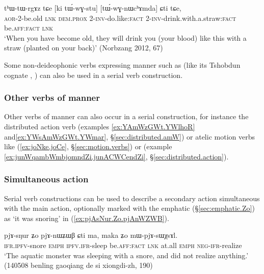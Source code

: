 \begin{exe}
\ex   \label{ex:ki.tWwGstu.tWGnWchAmda}
\gll tʰɯ-tɯ-rgɤz tɕe [ki tɯ́-wɣ-stu] [tɯ́-wɣ-nɯcʰɤmda] ɕti tɕe, \\
\textsc{aor}-2-be.old \textsc{lnk} \textsc{dem}.\textsc{prox} 2-\textsc{inv}-do.like:\textsc{fact} 2-\textsc{inv}-drink.with.a.straw:\textsc{fact} be.\textsc{aff}:\textsc{fact} \textsc{lnk} \\
\glt `When you have become old, they will drink you (your blood) like this with a straw (planted on your back)' (Norbzang 2012, 67)
\end{exe}

Some non-deideophonic verbs expressing manner such as  (like its Tshobdun cognate , \citealt[490--491]{sun12complementation}) can also be used in a serial verb construction.

\subsubsection{Other verbs of manner} \label{sec:svc.manner.other}
Other verbs of manner can also occur in a serial construction, for instance the distributed action verb  (examples \ref{ex:YAmWzGWt.YWlhoR} and\ref{ex:YWsAmWzGWt.YWmar}, §\ref{sec:distributed.amW}) or atelic motion verbs like  (\ref{ex:joNke.joCe}, §\ref{sec:motion.verbs}) or   (example \ref{ex:junWqambWmbjomndZi.junACWCendZi}, §\ref{sec:distributed.action}).

\subsubsection{Simultaneous action} \label{sec:svc.simultaneous}
Serial verb constructions can be used to describe a secondary action simultaneous with the main action, optionally marked with the emphatic  (§\ref{sec:emphatic.Zo}) as  `it was snoring' in (\ref{ex:pjAsNur.Zo.pjAnWZWB}).

\begin{exe}
\ex \label{ex:pjAsNur.Zo.pjAnWZWB}
\gll pjɤ-sŋur ʑo pjɤ-nɯʑɯβ ɕti ma, maka ʑo mɯ-pjɤ-sɯχsɤl. \\
\textsc{ifr}.\textsc{ipfv}-snore \textsc{emph} \textsc{ipfv}.\textsc{ifr}-sleep be.\textsc{aff}:\textsc{fact} \textsc{lnk} at.all \textsc{emph}  \textsc{neg}-\textsc{ifr}-realize \\
\glt `The aquatic monster was sleeping with a snore, and did not realize anything.' (140508 benling gaoqiang de si xiongdi-zh, 190)
\end{exe}



